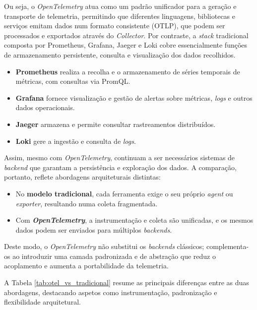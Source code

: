 Ou seja, o \textit{OpenTelemetry} atua como um padrão unificador para a geração e transporte de telemetria, permitindo que diferentes linguagens, bibliotecas e serviços emitam dados num formato consistente (OTLP), que podem ser processados e exportados através do \textit{Collector}. Por contraste, a \textit{stack} tradicional composta por Prometheus, Grafana, Jaeger e Loki cobre essencialmente funções de armazenamento persistente, consulta e visualização dos dados recolhidos.

\begin{itemize}
\item \textbf{Prometheus} realiza a recolha e o armazenamento de séries temporais de métricas, com consultas via PromQL.
\item \textbf{Grafana} fornece visualização e gestão de alertas sobre métricas, \textit{logs} e outros dados operacionais.
\item \textbf{Jaeger} armazena e permite consultar rastreamentos distribuídos.
\item \textbf{Loki} gere a ingestão e consulta de \textit{logs}.
\end{itemize}

Assim, mesmo com \textit{OpenTelemetry}, continuam a ser necessários sistemas de \textit{backend} que garantam a persistência e exploração dos dados. A comparação, portanto, reflete abordagens arquiteturais distintas:

\begin{itemize}
\item No \textbf{modelo tradicional}, cada ferramenta exige o seu próprio \textit{agent} ou \textit{exporter}, resultando numa coleta fragmentada.
\item Com \textbf{\textit{OpenTelemetry}}, a instrumentação e coleta são unificadas, e os mesmos dados podem ser enviados para múltiplos \textit{backends}.
\end{itemize}

Deste modo, o \textit{OpenTelemetry} não substitui os \textit{backends} clássicos; complementa-os ao introduzir uma camada padronizada e de abstração que reduz o acoplamento e aumenta a portabilidade da telemetria.

A Tabela \ref{tab:otel_vs_tradicional} resume as principais diferenças entre as duas abordagens, destacando aspetos como instrumentação, padronização e flexibilidade arquitetural.

